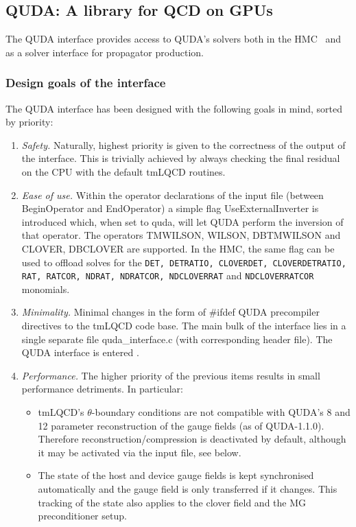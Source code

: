 
\subsection{QUDA: A library for QCD on GPUs}\label{subsec:quda}


The QUDA \cite{Clark:2009wm, Babich:2011np, Strelchenko:2013vaa} interface provides access to QUDA's solvers both in the HMC~\cite{Kostrzewa:2022hsv} and as a solver interface for propagator production.

\subsubsection{Design goals of the interface}
The QUDA interface has been designed with the following goals in mind, sorted by priority:
\begin{enumerate}
	\item \emph{Safety.} Naturally, highest priority is given to the correctness of the output of the interface. 
	This is trivially achieved by always checking the final residual on the CPU with the default tmLQCD routines.
\item \emph{Ease of use.} Within the operator declarations of the input file (between {\ttfamily BeginOperator} and {\ttfamily EndOperator}) a simple flag {\ttfamily UseExternalInverter} is introduced which, when set to {\ttfamily quda}, will let QUDA perform the inversion of that operator. The operators {\ttfamily TMWILSON, WILSON, DBTMWILSON} and {\ttfamily CLOVER, DBCLOVER} are supported. In the HMC, the same flag can be used to offload solves for the \texttt{DET, DETRATIO, CLOVERDET, CLOVERDETRATIO, RAT, RATCOR, NDRAT, NDRATCOR, NDCLOVERRAT} and \texttt{NDCLOVERRATCOR} monomials.
	\item \emph{Minimality.} Minimal changes in the form of {\ttfamily \#ifdef QUDA} precompiler directives to the tmLQCD code base. The main bulk of the interface lies in a single separate file {\ttfamily quda\_interface.c} (with corresponding header file). The QUDA interface is entered .
	\item \emph{Performance.} The higher priority of the previous items results in small performance detriments. In particular:
	\begin{itemize}
		\item tmLQCD's $\theta$-boundary conditions are not compatible with QUDA's 8 and 12 parameter reconstruction of the gauge fields (as of QUDA-1.1.0). Therefore reconstruction/compression is deactivated by default, although it may be activated via the input file, see below.
    \item The state of the host and device gauge fields is kept synchronised automatically and the gauge field is only transferred if it changes. This tracking of the state also applies to the clover field and the MG preconditioner setup.
	\end{itemize}
\end{enumerate}


